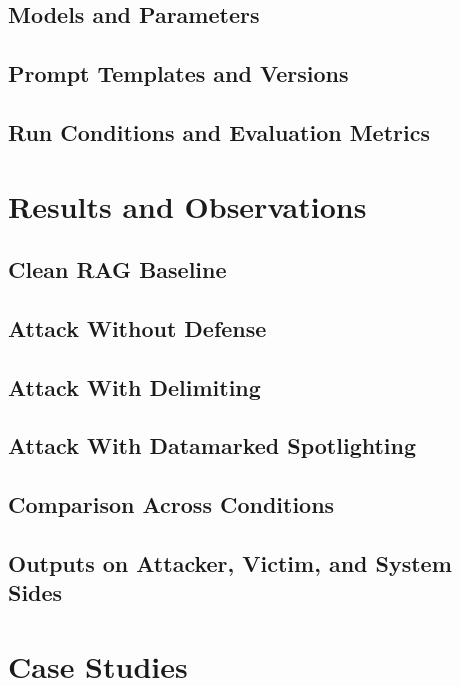 \documentclass[11pt]{article}
\begin{document}
\subsection{Models and Parameters}
\subsection{Prompt Templates and Versions}
\subsection{Run Conditions and Evaluation Metrics}

\section{Results and Observations}
\subsection{Clean RAG Baseline}
\subsection{Attack Without Defense}
\subsection{Attack With Delimiting}
\subsection{Attack With Datamarked Spotlighting}
\subsection{Comparison Across Conditions}
\subsection{Outputs on Attacker, Victim, and System Sides}

\section{Case Studies}
\end{document}
